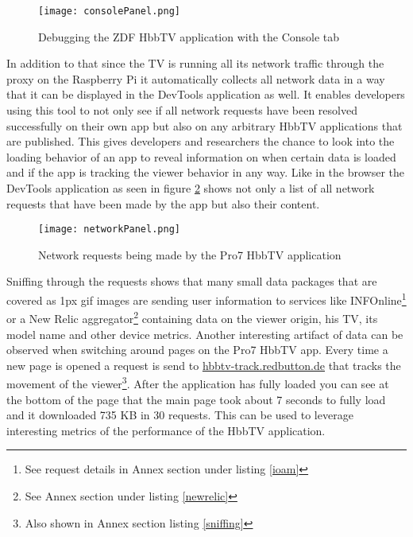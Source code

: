 \begin{figure}[htb]
  \centering
  \hspace*{-0.7cm}
  \texttt{[image: consolePanel.png]}\\
  \caption{Debugging the ZDF HbbTV application with the Console tab}\label{fig:consolePanel}
\end{figure}

In addition to that since the TV is running all its network traffic through the proxy on the Raspberry Pi it automatically collects all network data in a way that it can be displayed in the DevTools application as well. It enables developers using this tool to not only see if all network requests have been resolved successfully on their own app but also on any arbitrary HbbTV applications that are published. This gives developers and researchers the chance to look into the loading behavior of an app to reveal information on when certain data is loaded and if the app is tracking the viewer behavior in any way. Like in the browser the DevTools application as seen in figure \ref{fig:networkPanel} shows not only a list of all network requests that have been made by the app but also their content.

\begin{figure}[htb]
  \centering
  \hspace*{-0.7cm}
  \texttt{[image: networkPanel.png]}\\
  \caption{Network requests being made by the Pro7 HbbTV application}\label{fig:networkPanel}
\end{figure}

Sniffing through the requests shows that many small data packages that are covered as 1px gif images are sending user information to services like INFOnline\footnote{See request details in Annex section under listing \ref{ioam}} or a New Relic aggregator\footnote{See Annex section under listing \ref{newrelic}} containing data on the viewer origin, his TV, its model name and other device metrics. Another interesting artifact of data can be observed when switching around pages on the Pro7 HbbTV app. Every time a new page is opened a request is send to \url{hbbtv-track.redbutton.de} that tracks the movement of the viewer\footnote{Also shown in Annex section listing \ref{sniffing}}. After the application has fully loaded you can see at the bottom of the page that the main page took about 7 seconds to fully load and it downloaded 735 KB in 30 requests. This can be used to leverage interesting metrics of the performance of the HbbTV application.

